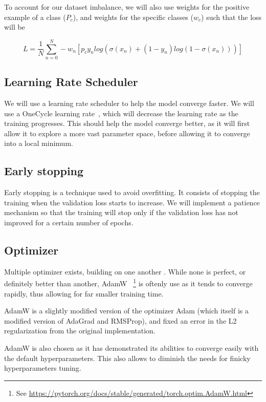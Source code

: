 \documentclass[11pt]{article}
\begin{document}
        To account for our dataset imbalance, we will also use weights for the positive example of a class ($P_c$), and weights for the specific classes ($w_c$) such that the loss will be

        \begin{equation}
            L = \frac{1}{N}\sum_{n=0}^N -w_n[p_c y_n log(\sigma(x_n)+(1-y_n) log(1-\sigma(x_n)))]
        \end{equation}

    \subsection{Learning Rate Scheduler}

        We will use a learning rate scheduler to help the model converge faster. We will use a OneCycle learning rate~\cite{onecyclelr}, which will
        decrease the learning rate as the training progresses. This should help the model converge better, as it will first allow it to explore a more vast
        parameter space, before allowing it to converge into a local minimum.

    \subsection{Early stopping}

        Early stopping is a technique used to avoid overfitting. It consists of stopping the training when the validation loss starts to increase. We will
        implement a patience mechanism so that the training will stop only if the validation loss has not improved for a certain number of epochs.
    \subsection{Optimizer}

        Multiple optimizer exists, building on one another . While none is perfect, or definitely better than another, AdamW~\cite{adamw} \footnote{See \url{https://pytorch.org/docs/stable/generated/torch.optim.AdamW.html}} is oftenly use as it tends
        to converge rapidly, thus allowing for far smaller training time.

        AdamW is a slightly modified version of the optimizer Adam (which itself is a modified version of AdaGrad and RMSProp), and fixed an error in the L2 regularization from the original implementation.

        AdamW is also chosen as it has demonstrated its abilities to converge easily with the default hyperparameters. This also allows to diminish the needs for finicky hyperparameters tuning.
\end{document}
